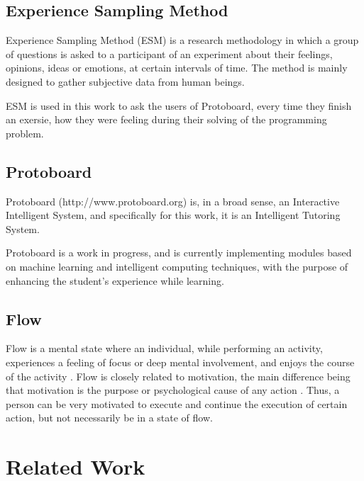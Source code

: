 \documentclass{acm_proc_article-sp}
\begin{document}

\subsection{Experience Sampling Method}
\label{ESM}

Experience Sampling Method (ESM) is a research methodology in which a
group of questions is asked to a participant of an experiment about
their feelings, opinions, ideas or emotions, at certain intervals of
time. The method is mainly designed to gather subjective data from
human beings.

ESM is used in this work to ask the users of Protoboard, every time
they finish an exersie, how they were feeling during their solving of
the programming problem.


\subsection{Protoboard}

Protoboard (http://www.protoboard.org) is, in a broad sense, an
Interactive Intelligent System, and specifically for this work, it is
an Intelligent Tutoring System.

Protoboard is a work in progress, and is currently implementing
modules based on machine learning and intelligent computing
techniques, with the purpose of enhancing the student's experience
while learning.



\subsection{Flow}
\label{flow}

Flow is a mental state where an individual, while performing an
activity, experiences a feeling of focus or deep mental
involvement, and enjoys the course of the activity \cite{csiksczentmihalyi2004flow}. Flow
is closely related to motivation, the main difference being that
motivation is the purpose or psychological cause of any action
\cite{schacter2010psychology}. Thus, a person can be very motivated to execute and
continue the execution of certain action, but not necessarily be in a
state of flow.


\section{Related Work}
\label{related-work}
\end{document}
